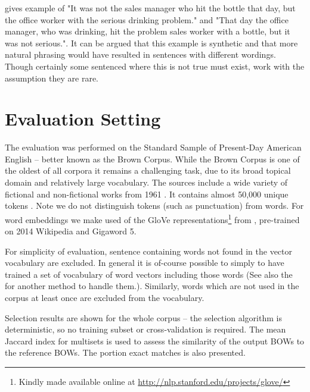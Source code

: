 \documentclass[11pt]{article}
\numberwithin{equation}{section}
\numberwithin{figure}{section}
\theoremstyle{plain}
\theoremstyle{definition}
\begin{document}
\textcite{Mitchell2008} gives  example of  "It was not the sales manager who  hit  the bottle that day, but the office worker with the serious drinking problem." and "That day the office manager,   who was drinking, hit the problem sales worker with a bottle, but it was not serious.". It  can be argued that this example is synthetic and that more natural phrasing would have resulted in sentences with different wordings. Though certainly some sentenced where this is not true must exist, work with the assumption they are rare.
  



\section{Evaluation Setting} \label{evalsettings}

The evaluation was performed on the  Standard Sample of Present-Day American English -- better known as the Brown Corpus. While the Brown Corpus is one of the oldest of all corpora it remains a challenging task, due to its broad topical domain and relatively large vocabulary. The sources include a wide variety of fictional and non-fictional works from 1961 \parencite{francis1979brown}. It contains almost 50,000 unique tokens . Note we do not distinguish tokens (such as punctuation) from words. For word embeddings we make used of the GloVe representations\footnote{Kindly made available online at \url{http://nlp.stanford.edu/projects/glove/}} from \textcite{pennington2014glove}, pre-trained on 2014 Wikipedia and Gigaword 5. 

For simplicity of evaluation, sentence containing words not found in the vector vocabulary are excluded.  In general it is of-course possible to simply to have trained a set of vocabulary of word vectors including those words (See also the  for another method to handle them.). Similarly, words which are not used in the corpus at least once are excluded from the vocabulary.

Selection results are shown for the whole corpus -- the selection algorithm is deterministic, so no training subset or cross-validation is required. The mean Jaccard index for multisets is used to assess the similarity of the output BOWs to the reference BOWs. The portion exact matches is also presented.
\end{document}
